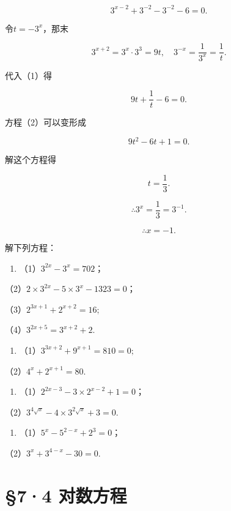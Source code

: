 \[
3^{x - 2} + 3^{- 2} - 3^{- 2} - 6 = 0. \tag {1}
\]

 令\(t = -3^x\)，那末

\[
3^{x + 2} = 3^{x} \cdot 3^{3} = 9 t, \quad 3^{- x} = \frac{1}{3^{x}} = \frac{1}{t}.
\]

代入（1）得

\[
9 t + \frac{1}{t} - 6 = 0. \tag {2}
\]

方程（2）可以变形成

\[
9 t^{2} - 6 t + 1 = 0.
\]

解这个方程得

\[
t = \frac{1}{3}.
\]

\[
\therefore 3^{x} = \frac{1}{3} = 3^{- 1}.
\]

\[
\therefore x = - 1.
\]

解下列方程：

\begin{enumerate}
\item
  （1）\(3^{2x} - 3^x = 702\)；
\end{enumerate}

（2）\(2 \times 3^{2x} - 5 \times 3^{x} - 1323 = 0\)；

（3）\(2^{3x + 1} + 2^{x + 2} = 16;\)

（4）\(3^{2x + 5} = 3^{x + 2} + 2.\)

\begin{enumerate}[start=2]
\item
  （1）\(3^{3x + 2} + 9^{x + 1} = 810 = 0;\)
\end{enumerate}

（2）\(4^{x} + 2^{x + 1} = 80.\)

\begin{enumerate}[start=3]
\item
  （1）\(2^{2x - 3} - 3 \times 2^{x - 2} + 1 = 0\)；
\end{enumerate}

（2）\(3^{4\sqrt{x}} - 4 \times 3^{2\sqrt{x}} + 3 = 0.\)

\begin{enumerate}[start=4]
\item
  （1）\(5^{x} - 5^{2 - x} + 2^{3} = 0\)；
\end{enumerate}

（2）\(3^{x} + 3^{4 - x} - 30 = 0.\)

\section{§7·4 对数方程}

